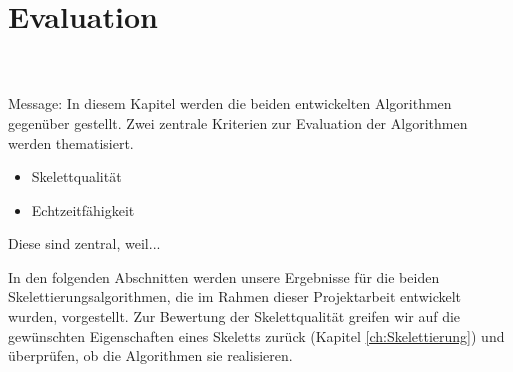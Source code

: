 \chapter{Evaluation}
\\\\
Message: In diesem Kapitel werden die beiden entwickelten Algorithmen gegenüber gestellt. Zwei zentrale Kriterien zur Evaluation der Algorithmen werden thematisiert.
\begin{itemize}
\item Skelettqualität
\item Echtzeitfähigkeit
\end{itemize}
Diese sind zentral, weil...

In den folgenden Abschnitten werden unsere Ergebnisse für die beiden Skelettierungsalgorithmen, die im
Rahmen dieser Projektarbeit entwickelt wurden, vorgestellt. Zur Bewertung der Skelettqualität greifen wir auf die
gewünschten Eigenschaften eines Skeletts zurück (Kapitel \ref{ch:Skelettierung}) und überprüfen, ob die Algorithmen sie realisieren.

